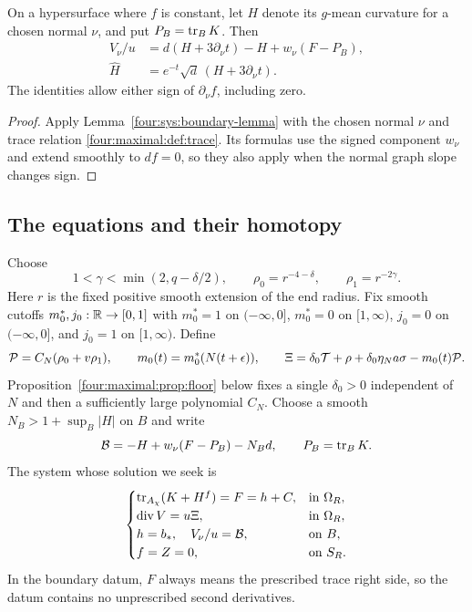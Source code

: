 \begin{lemma}\label{four:maximal:lem:boundary-identity}
On a hypersurface where $f$ is constant, let $H$ denote its $g$-mean
curvature for a chosen normal $\nu$, and put $P_B=\operatorname{tr}_BK$.  Then
\begin{align}
 V_\nu/u&=d(H+3\partial_\nu t)-H+w_\nu(F-P_B),
 \label{four:maximal:def:boundary-flux}\\
 \widehat H&=e^{-t}\sqrt d\,(H+3\partial_\nu t).
 \label{four:maximal:def:boundary-curvature}
\end{align}
The identities allow either sign of $\partial_\nu f$, including zero.
\end{lemma}

\begin{proof}
Apply Lemma~\ref{four:sys:boundary-lemma} with the chosen normal $\nu$
and trace relation \eqref{four:maximal:def:trace}.  Its formulas use
the signed component $w_\nu$ and extend smoothly to $df=0$, so they
also apply when the normal graph slope changes sign.
\end{proof}

\subsection{The equations and their homotopy}\label{four:maximal:def:homotopy}

Choose
\begin{equation}\label{four:maximal:def:end-weights}
 1<\gamma<\min(2,q-\delta/2),\qquad
 \rho_0=r^{-4-\delta},\qquad \rho_1=r^{-2\gamma}.
\end{equation}
Here $r$ is the fixed positive smooth extension of the end radius.
Fix smooth cutoffs $m_0^*,j_0:\mathbb R\to[0,1]$ with $m_0^*=1$ on
$(-\infty,0]$, $m_0^*=0$ on $[1,\infty)$, $j_0=0$ on
$(-\infty,0]$, and $j_0=1$ on $[1,\infty)$.  Define
\begin{equation}\label{four:maximal:def:penalty}
 \mathcal P=C_N(\rho_0+v\rho_1),\qquad
 m_0(t)=m_0^*(N(t+\epsilon)),\qquad
 \Xi=\delta_0\mathcal T+\rho+\delta_0\eta_N a\sigma-m_0(t)\mathcal P.
\end{equation}
Proposition~\ref{four:maximal:prop:floor} below fixes a single $\delta_0>0$ independent
of $N$ and then a sufficiently large polynomial $C_N$.
Choose a smooth $N_B>1+\sup_B|H|$ on $B$ and write
\begin{equation}\label{four:maximal:def:boundary-datum}
 \mathcal B=-H+w_\nu(F-P_B)-N_Bd,\qquad P_B=\operatorname{tr}_BK.
\end{equation}
The system whose solution we seek is
\begin{equation}\label{four:maximal:def:system}
 \begin{cases}
  \operatorname{tr}_{A_\chi}(K+H^f)=F=h+C,&\text{in }\Omega_R,\\
  \operatorname{div} V=u\Xi,&\text{in }\Omega_R,\\
  h=b_*,\quad V_\nu/u=\mathcal B,&\text{on }B,\\
  f=Z=0,&\text{on }S_R.
 \end{cases}
\end{equation}
In the boundary datum, $F$ always means the prescribed trace right side,
so the datum contains no unprescribed second derivatives.

